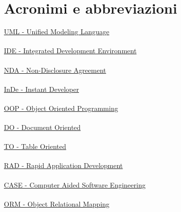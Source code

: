 \chapter{Acronimi e abbreviazioni}

\noindent \hyperref[UMLl]{UML - Unified Modeling Language}
\\
\\
\noindent \hyperref[IDE]{IDE - Integrated Development Environment}
\\
\\
\noindent \hyperref[NDA]{NDA - Non-Disclosure Agreement}
\\
\\
\noindent \hyperref[InDe]{InDe - Instant Developer}
\\
\\
\noindent \hyperref[OOP]{OOP - Object Oriented Programming}
\\
\\
\noindent \hyperref[DO]{DO - Document Oriented}
\\
\\
\noindent \hyperref[TO]{TO - Table Oriented}
\\
\\
\noindent \hyperref[RAD]{RAD - Rapid Application Development}
\\
\\
\noindent \hyperref[CASE]{CASE - Computer Aided Software Engineering}
\\
\\

\noindent \hyperref[ORM]{ORM - Object Relational Mapping}
\\
\\

